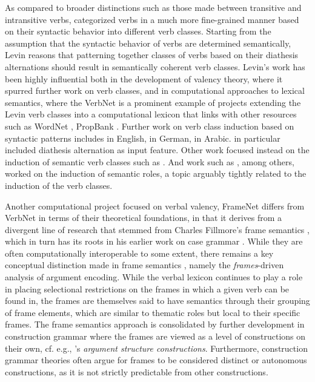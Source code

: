 As compared to broader distinctions such as those made between transitive and intransitive verbs, \citet{levin1993} categorized verbs in a much more fine-grained manner based on their syntactic behavior into different verb classes. Starting from the assumption that the syntactic behavior of verbs are determined semantically, Levin reasons that patterning together classes of verbs based on their diathesis alternations should result in semantically coherent verb classes. Levin's work has been highly influential both in the development of valency theory, where it spurred further work on verb classes, and in computational approaches to lexical semantics, where the VerbNet \citep{kipper-schuler2005, kipper2006, kipper2008} is a prominent example of projects extending the Levin verb classes into a computational lexicon that links with other resources such as WordNet \citep{fellbaum1998, miller1995}, PropBank \citep{kingsbury2002}. Further work on verb class induction based on syntactic patterns includes \citet{basili1993, navarretta2000, korhonen2006, sun2008, sun2009,sun2013} in English, \citet{schulteimwalde2002, schulteimwalde2003, schulteimwalde2006} in German, \citet{snider2006} in Arabic. \citet{sun2013} in particular included diathesis alternation as input feature. Other work focused instead on the induction of semantic verb classes such as \citet{furstenau2012, majewska2018, majewska2020}. And work such as \citet{dowty1991, abend2009, titov2012, bickel2014, sayeed2018, watanabe2010, yamada2021}, among others, worked on the induction of semantic roles, a topic arguably tightly related to the induction of the verb classes.
 
Another computational project focused on verbal valency, FrameNet \citep{baker1998, fillmore2015} differs from VerbNet in terms of their theoretical foundations, in that it derives from a divergent line of research that stemmed from Charles Fillmore's frame semantics \citep{fillmore1977, fillmore1977a, fillmore1982}, which in turn has its roots in his earlier work on case grammar \citep{fillmore1968,fillmore1970}. While they are often computationally interoperable to some extent, there remains a key conceptual distinction made in frame semantics \citet{fillmore1968}, namely the \textit{frames}-driven analysis of argument encoding. While the verbal lexicon continues to play a role in placing selectional restrictions on the frames in which a given verb can be found in, the frames are themselves said to have semantics through their grouping of frame elements, which are similar to thematic roles but local to their specific frames. The frame semantics approach is consolidated by further development in construction grammar where the frames are viewed as a level of constructions on their own, cf. e.g., \citet{goldberg1992,goldberg1995}'s \textit{argument structure constructions}. Furthermore, construction grammar theories often argue for frames to be considered distinct or autonomous constructions, as it is not strictly predictable from other constructions.

